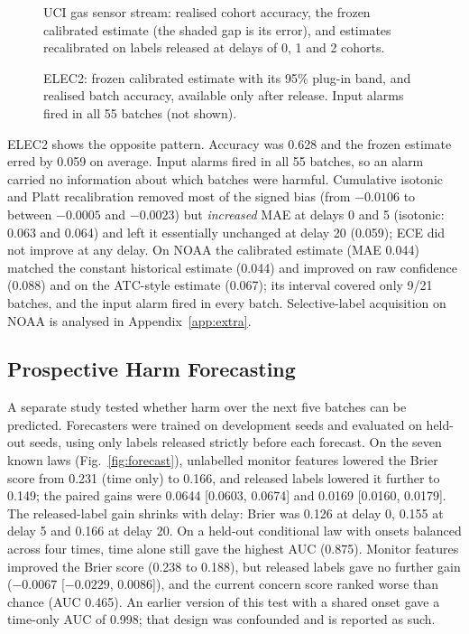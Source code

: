 \begin{figure}[t]
\centering
\resizebox{\columnwidth}{!}{}
\caption{UCI gas sensor stream: realised cohort accuracy, the frozen calibrated estimate (the shaded gap is its error), and estimates recalibrated on labels released at delays of 0, 1 and 2 cohorts.}
\label{fig:uci}
\end{figure}

\begin{figure}[t]
\centering
\resizebox{\columnwidth}{!}{}
\caption{ELEC2: frozen calibrated estimate with its 95\% plug-in band, and realised batch accuracy, available only after release. Input alarms fired in all 55 batches (not shown).}
\label{fig:elec2}
\end{figure}

ELEC2 shows the opposite pattern. Accuracy was 0.628 and the frozen estimate erred by
0.059 on average. Input alarms fired in all 55 batches, so an alarm carried no
information about which batches were harmful. Cumulative isotonic and Platt
recalibration removed most of the signed bias (from $-0.0106$ to between $-0.0005$ and
$-0.0023$) but \emph{increased} MAE at delays 0 and 5 (isotonic: 0.063 and 0.064) and
left it essentially unchanged at delay 20 (0.059); ECE did not improve at any delay.
On NOAA the calibrated estimate (MAE 0.044) matched the constant historical estimate
(0.044) and improved on raw confidence (0.088) and on the ATC-style estimate (0.067);
its interval covered only 9/21 batches, and the input alarm fired in every batch.
Selective-label acquisition on NOAA is analysed in Appendix~\ref{app:extra}.

\subsection{Prospective Harm Forecasting}
\label{sec:res-forecast}
A separate study tested whether harm over the next five batches can be predicted.
Forecasters were trained on development seeds and evaluated on held-out seeds, using
only labels released strictly before each forecast. On the seven known laws
(Fig.~\ref{fig:forecast}), unlabelled monitor features lowered the Brier score from
0.231 (time only) to 0.166, and released labels lowered it further to 0.149; the paired
gains were 0.0644 [0.0603, 0.0674] and 0.0169 [0.0160, 0.0179]. The released-label gain
shrinks with delay: Brier was 0.126 at delay 0, 0.155 at delay 5 and 0.166 at delay 20.
On a held-out conditional law with onsets balanced across four times, time alone still
gave the highest AUC (0.875). Monitor features improved the Brier score (0.238 to
0.188), but released labels gave no further gain ($-0.0067$ [$-0.0229$, 0.0086]), and
the current concern score ranked worse than chance (AUC 0.465). An earlier version of
this test with a shared onset gave a time-only AUC of 0.998; that design was
confounded and is reported as such.


